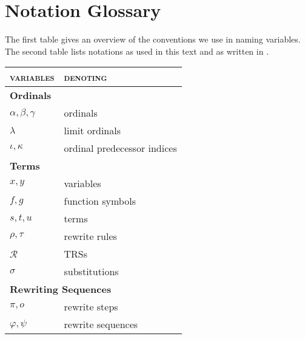 \chapter{Notation Glossary}\label{chap:glossary}

The first table gives an overview of the conventions we use in naming
variables. The second table lists notations as used in this text and
as written in \Coq.
\begin{center}
{\renewcommand{\arraystretch}{1.1}
\renewcommand{\tabcolsep}{10pt}
\begin{tabular}{p{130pt} p{130pt}}
\textsc{variables} & \textsc{denoting}\\
\hline
\multicolumn{2}{l}{\bf Ordinals}\\
$\alpha, \beta, \gamma$ & ordinals\\
$\lambda$ & limit ordinals\\
$\iota, \kappa$ & ordinal predecessor indices\\
\multicolumn{2}{l}{\bf Terms}\\
$x, y$ & variables\\
$f, g$ & function symbols\\
$s, t, u$ & terms\\
$\rho, \tau$ & rewrite rules\\
$\mathcal{R}$ & TRSs\\
$\sigma$ & substitutions\\
\multicolumn{2}{l}{\bf Rewriting Sequences}\\
$\pi, o$ & rewrite steps\\
$\varphi, \psi$ & rewrite sequences\\
\end{tabular}}
\end{center}

